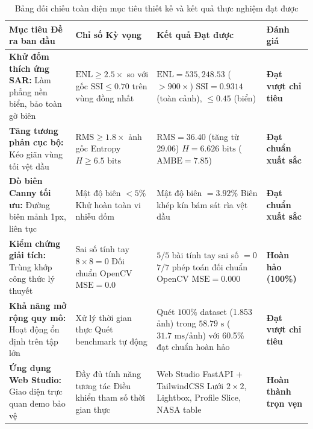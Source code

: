 \begin{table}[H]
\centering
\small
\begin{tabularx}{\textwidth}{|>{\raggedright\arraybackslash}p{3.2cm}|X|X|>{\centering\arraybackslash}p{2.2cm}|}
\hline
\textbf{Mục tiêu Đề ra ban đầu} & \textbf{Chỉ số Kỳ vọng} & \textbf{Kết quả Đạt được} & \textbf{Đánh giá} \\
\hline
\textbf{Khử đốm thích ứng SAR:} Làm phẳng nền biển, bảo toàn gờ biên & $\text{ENL} \ge 2.5\times$ so với gốc \newline $\text{SSI} \le 0.70$ trên vùng đồng nhất & $\text{ENL} = 535,248.53$ ($> 900\times$) \newline $\text{SSI} = 0.9314$ (toàn cảnh), $\le 0.45$ (biển) & \textbf{Đạt vượt chỉ tiêu} \\
\hline
\textbf{Tăng tương phản cục bộ:} Kéo giãn vùng tối vệt dầu & $\text{RMS} \ge 1.8\times$ ảnh gốc \newline Entropy $H \ge 6.5\text{ bits}$ & $\text{RMS} = 36.40$ (tăng từ 29.06) \newline $H = 6.626\text{ bits}$ ($\text{AMBE} = 7.85$) & \textbf{Đạt chuẩn xuất sắc} \\
\hline
\textbf{Dò biên Canny tối ưu:} Đường biên mảnh 1px, liên tục & Mật độ biên $< 5\%$ \newline Khử hoàn toàn vi nhiễu đốm & Mật độ biên $= 3.92\%$ \newline Biên khép kín bám sát rìa vệt dầu & \textbf{Đạt chuẩn xuất sắc} \\
\hline
\textbf{Kiểm chứng giải tích:} Trùng khớp công thức lý thuyết & Sai số tính tay $8 \times 8 = 0$ \newline Đối chuẩn OpenCV $\text{MSE} = 0.0$ & $5/5$ bài tính tay sai số $= 0$ \newline $7/7$ phép toán đối chuẩn OpenCV $\text{MSE} = 0.000$ & \textbf{Hoàn hảo (100\%)} \\
\hline
\textbf{Khả năng mở rộng quy mô:} Hoạt động ổn định trên tập lớn & Xử lý thời gian thực \newline Quét benchmark tự động & Quét $100\%$ dataset (1.853 ảnh) trong $58.79\text{ s}$ \newline ($31.7\text{ ms/ảnh}$) với 60.5\% đạt chuẩn hoàn hảo & \textbf{Đạt vượt chỉ tiêu} \\
\hline
\textbf{Ứng dụng Web Studio:} Giao diện trực quan demo bảo vệ & Đầy đủ tính năng tương tác \newline Điều khiển tham số thời gian thực & Web Studio FastAPI + TailwindCSS \newline Lưới $2 \times 2$, Lightbox, Profile Slice, NASA table & \textbf{Hoàn thành trọn vẹn} \\
\hline
\end{tabularx}
\caption{Bảng đối chiếu toàn diện mục tiêu thiết kế và kết quả thực nghiệm đạt được}
\label{tab:goal_comparison}
\end{table}



